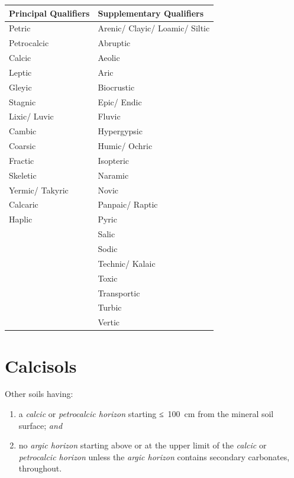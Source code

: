 \documentclass[
  letterpaper,
  DIV=11,
  numbers=noendperiod]{scrreprt}
\providecommand{\tightlist}{%
  \setlength{\itemsep}{0pt}\setlength{\parskip}{0pt}}\usepackage{longtable,booktabs,array}
\begin{document}
\begin{longtable}[]{@{}ll@{}}
\toprule()
Principal Qualifiers & Supplementary Qualifiers \\
\midrule()
\endhead
Petric & Arenic/ Clayic/ Loamic/ Siltic \\
Petrocalcic & Abruptic \\
Calcic & Aeolic \\
Leptic & Aric \\
Gleyic & Biocrustic \\
Stagnic & Epic/ Endic \\
Lixic/ Luvic & Fluvic \\
Cambic & Hypergypsic \\
Coarsic & Humic/ Ochric \\
Fractic & Isopteric \\
Skeletic & Naramic \\
Yermic/ Takyric & Novic \\
Calcaric & Panpaic/ Raptic \\
Haplic & Pyric \\
& Salic \\
& Sodic \\
& Technic/ Kalaic \\
& Toxic \\
& Transportic \\
& Turbic \\
& Vertic \\
\bottomrule()
\end{longtable}


\hypertarget{key-calcisols}{%
\chapter{Calcisols}\label{key-calcisols}}

Other soils having:

\begin{enumerate}
\def\labelenumi{\arabic{enumi}.}
\tightlist
\item
  a \emph{calcic} or \emph{petrocalcic horizon} starting ≤~100~cm from
  the mineral soil surface; \emph{and}
\item
  no \emph{argic horizon} starting above or at the upper limit of the
  \emph{calcic} or \emph{petrocalcic horizon} unless the \emph{argic
  horizon} contains secondary carbonates, throughout.
\end{enumerate}
\end{document}
